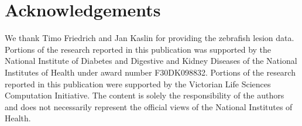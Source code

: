 
\section*{Acknowledgements}
  \label{sec:acknowledgements}

  We thank Timo Friedrich and Jan Kaslin for providing the zebrafish lesion data. Portions of the research reported in this publication was supported by the National Institute of Diabetes and Digestive and Kidney Diseases of the National Institutes of Health under award number F30DK098832. Portions of the research reported in this publication were supported by the Victorian Life Sciences Computation Initiative. The content is solely the responsibility of the authors and does not necessarily represent the official views of the National Institutes of Health.
